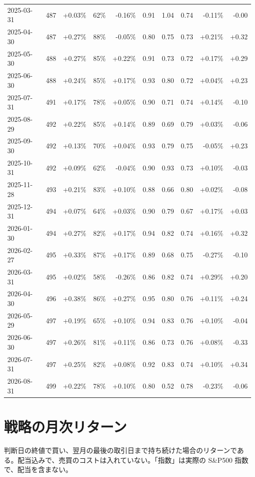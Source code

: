 \documentclass[xelatex,ja=standard,jafont=hiragino-pron,a4paper,10pt]{bxjsreport}
\newcommand{\SP}{S\&P500}
\begin{document}
{\begin{longtable}{lrrrrrrrrr}
2025-03-31 & 487 & +0.03\% & 62\% & -0.16\% & 0.91 & 1.04 & 0.74 & -0.11\% & -0.00 \\
2025-04-30 & 487 & +0.27\% & 88\% & -0.05\% & 0.80 & 0.75 & 0.73 & +0.21\% & +0.32 \\
2025-05-30 & 488 & +0.27\% & 85\% & +0.22\% & 0.91 & 0.73 & 0.72 & +0.17\% & +0.29 \\
2025-06-30 & 488 & +0.24\% & 85\% & +0.17\% & 0.93 & 0.80 & 0.72 & +0.04\% & +0.23 \\
2025-07-31 & 491 & +0.17\% & 78\% & +0.05\% & 0.90 & 0.71 & 0.74 & +0.14\% & -0.10 \\
2025-08-29 & 492 & +0.22\% & 85\% & +0.14\% & 0.89 & 0.69 & 0.79 & +0.03\% & -0.06 \\
2025-09-30 & 492 & +0.13\% & 70\% & +0.04\% & 0.93 & 0.79 & 0.75 & -0.05\% & +0.23 \\
2025-10-31 & 492 & +0.09\% & 62\% & -0.04\% & 0.90 & 0.93 & 0.73 & +0.10\% & -0.03 \\
2025-11-28 & 493 & +0.21\% & 83\% & +0.10\% & 0.88 & 0.66 & 0.80 & +0.02\% & -0.08 \\
2025-12-31 & 494 & +0.07\% & 64\% & +0.03\% & 0.90 & 0.79 & 0.67 & +0.17\% & +0.03 \\
2026-01-30 & 494 & +0.27\% & 82\% & +0.17\% & 0.94 & 0.82 & 0.74 & +0.16\% & +0.32 \\
2026-02-27 & 495 & +0.33\% & 87\% & +0.17\% & 0.89 & 0.68 & 0.75 & -0.27\% & -0.10 \\
2026-03-31 & 495 & +0.02\% & 58\% & -0.26\% & 0.86 & 0.82 & 0.74 & +0.29\% & +0.20 \\
2026-04-30 & 496 & +0.38\% & 86\% & +0.27\% & 0.95 & 0.80 & 0.76 & +0.11\% & +0.24 \\
2026-05-29 & 497 & +0.19\% & 65\% & +0.10\% & 0.94 & 0.83 & 0.76 & +0.10\% & -0.04 \\
2026-06-30 & 497 & +0.26\% & 81\% & +0.11\% & 0.86 & 0.73 & 0.76 & +0.08\% & -0.33 \\
2026-07-31 & 497 & +0.25\% & 82\% & +0.08\% & 0.92 & 0.83 & 0.74 & +0.10\% & +0.34 \\
2026-08-31 & 499 & +0.22\% & 78\% & +0.10\% & 0.80 & 0.52 & 0.78 & -0.23\% & -0.06 \\
\end{longtable}
}

\section{戦略の月次リターン}

判断日の終値で買い、翌月の最後の取引日まで持ち続けた場合のリターンである。配当込みで、売買のコストは入れていない。「指数」は実際の \SP{} 指数で、配当を含まない。
\end{document}
